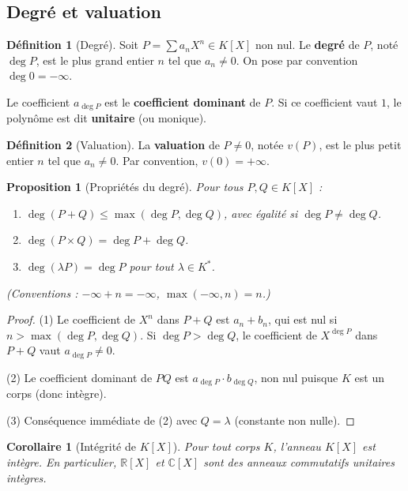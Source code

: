 \documentclass[12pt,a4paper]{report}
\newtheorem{proposition}[theoreme]{Proposition}
\newtheorem{corollaire}[theoreme]{Corollaire}
\theoremstyle{definition}
\newtheorem{definition}{Définition}[section]
\theoremstyle{remark}
\begin{document}
\subsection{Degré et valuation}

\begin{definition}[Degré]
Soit $P = \sum a_n X^n \in K[X]$ non nul. Le \textbf{degré} de $P$, noté $\deg P$, est le plus grand entier $n$ tel que $a_n \neq 0$. On pose par convention $\deg 0 = -\infty$.

Le coefficient $a_{\deg P}$ est le \textbf{coefficient dominant} de $P$. Si ce coefficient vaut $1$, le polynôme est dit \textbf{unitaire} (ou monique).
\end{definition}

\begin{definition}[Valuation]
La \textbf{valuation} de $P \neq 0$, notée $v(P)$, est le plus petit entier $n$ tel que $a_n \neq 0$. Par convention, $v(0) = +\infty$.
\end{definition}

\begin{proposition}[Propriétés du degré]
Pour tous $P, Q \in K[X]$ :
\begin{enumerate}
    \item $\deg(P + Q) \le \max(\deg P, \deg Q)$, avec égalité si $\deg P \neq \deg Q$.
    \item $\deg(P \times Q) = \deg P + \deg Q$.
    \item $\deg(\lambda P) = \deg P$ pour tout $\lambda \in K^*$.
\end{enumerate}
(Conventions : $-\infty + n = -\infty$, $\max(-\infty, n) = n$.)
\end{proposition}

\begin{proof}
(1) Le coefficient de $X^n$ dans $P + Q$ est $a_n + b_n$, qui est nul si $n > \max(\deg P, \deg Q)$. Si $\deg P > \deg Q$, le coefficient de $X^{\deg P}$ dans $P + Q$ vaut $a_{\deg P} \neq 0$.

(2) Le coefficient dominant de $PQ$ est $a_{\deg P} \cdot b_{\deg Q}$, non nul puisque $K$ est un corps (donc intègre).

(3) Conséquence immédiate de (2) avec $Q = \lambda$ (constante non nulle).
\end{proof}

\begin{corollaire}[{Intégrité de $K[X]$}]
Pour tout corps $K$, l'anneau $K[X]$ est \emph{intègre}. En particulier, $\mathbb{R}[X]$ et $\mathbb{C}[X]$ sont des anneaux commutatifs unitaires intègres.
\end{corollaire}
\end{document}
